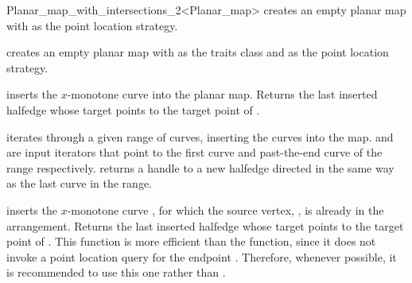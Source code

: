 \begin{ccRefClass}{Planar_map_with_intersections_2<Planar_map>}
  {creates an empty planar map with  as the point location strategy.}

  {creates an empty planar map with  as the traits class and  as the point location strategy.}

\ccOperations

         {inserts the $x$-monotone curve  into the planar map.
	 Returns the last inserted halfedge whose target points to the
	 target point of .
	 }

  {iterates through a given range of curves, inserting the curves into the
   map.  and  are input iterators that point to the first
   curve and past-the-end curve of the range respectively.  
   returns a handle to a new halfedge directed in the same way as the last 
   curve in the range.
   }

         {inserts  the $x$-monotone curve , for
	 which the source vertex, , is already in the
	 arrangement.
	 Returns the last inserted halfedge whose target points to the
	 target point of .
	 This function is more efficient than the  function,
	 since it does not invoke a point location query for the
	 endpoint . Therefore,
	 whenever possible, it is recommended to use this one rather
	 than .
	 }

\begin{ccAdvanced}



\end{ccAdvanced}
\end{ccRefClass}

